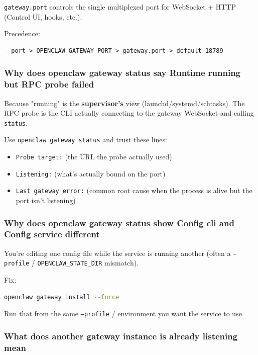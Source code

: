 \texttt{gateway.port} controls the single multiplexed port for WebSocket + HTTP (Control UI, hooks, etc.).

Precedence:

\begin{lstlisting}
--port > OPENCLAW_GATEWAY_PORT > gateway.port > default 18789
\end{lstlisting}


\subsubsection{Why does openclaw gateway status say Runtime running but RPC probe failed}


Because "running" is the \textbf{supervisor's} view (launchd/systemd/schtasks). The RPC probe is the CLI actually connecting to the gateway WebSocket and calling \texttt{status}.

Use \texttt{openclaw gateway status} and trust these lines:

\begin{itemize}
  \item \texttt{Probe target:} (the URL the probe actually used)
  \item \texttt{Listening:} (what's actually bound on the port)
  \item \texttt{Last gateway error:} (common root cause when the process is alive but the port isn't listening)
\end{itemize}


\subsubsection{Why does openclaw gateway status show Config cli and Config service different}


You're editing one config file while the service is running another (often a \texttt{--profile} / \texttt{OPENCLAW\_STATE\_DIR} mismatch).

Fix:

\begin{lstlisting}[language=bash]
openclaw gateway install --force
\end{lstlisting}


Run that from the same \texttt{--profile} / environment you want the service to use.

\subsubsection{What does another gateway instance is already listening mean}


